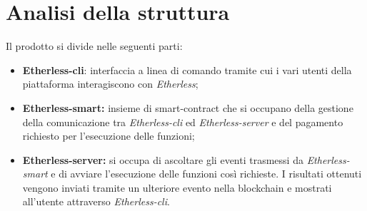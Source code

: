 \section{Analisi della struttura}
Il prodotto si divide nelle seguenti parti: 
\begin{itemize}
	\item \textbf{Etherless-cli}: interfaccia a linea di comando tramite cui i vari utenti della piattaforma interagiscono con \textit{Etherless}; 
	\item \textbf{Etherless-smart:} insieme di smart-contract che si occupano della gestione della comunicazione tra \textit{Etherless-cli} ed \textit{Etherless-server} e del pagamento richiesto per l'esecuzione delle funzioni; 
	\item \textbf{Etherless-server:} si occupa di ascoltare gli eventi trasmessi da \textit{Etherless-smart} e di avviare l'esecuzione delle funzioni così richieste. I risultati ottenuti vengono inviati tramite un ulteriore evento nella blockchain e mostrati all'utente attraverso \textit{Etherless-cli}.
\end{itemize}

